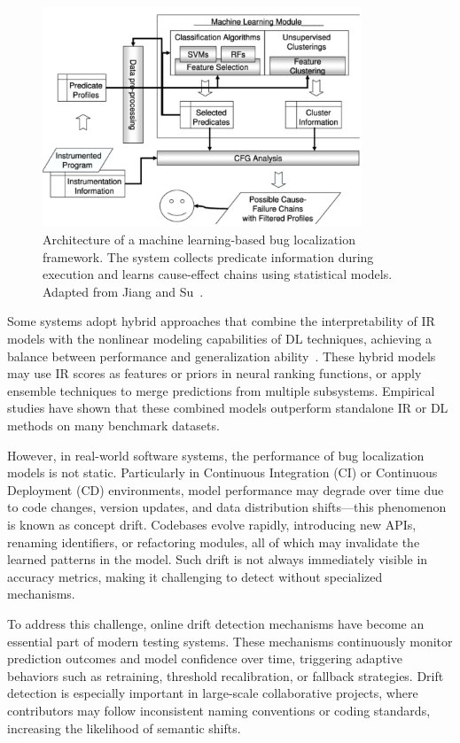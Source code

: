 \documentclass[manuscript,screen,review]{acmart}
\begin{document}
\begin{figure}[htbp]
  \centering
  \includegraphics[width=0.85\textwidth]{picture/5.1fig1.png}
  \caption{Architecture of a machine learning-based bug localization framework. The system collects predicate information during execution and learns cause-effect chains using statistical models. Adapted from Jiang and Su~\cite{Li2024}.}
  \label{fig:framework}
\end{figure}

Some systems adopt hybrid approaches that combine the interpretability of IR models with the nonlinear modeling capabilities of DL techniques, achieving a balance between performance and generalization ability~\cite{Li2024}. These hybrid models may use IR scores as features or priors in neural ranking functions, or apply ensemble techniques to merge predictions from multiple subsystems. Empirical studies have shown that these combined models outperform standalone IR or DL methods on many benchmark datasets.

However, in real-world software systems, the performance of bug localization models is not static. Particularly in Continuous Integration (CI) or Continuous Deployment (CD) environments, model performance may degrade over time due to code changes, version updates, and data distribution shifts---this phenomenon is known as concept drift. Codebases evolve rapidly, introducing new APIs, renaming identifiers, or refactoring modules, all of which may invalidate the learned patterns in the model. Such drift is not always immediately visible in accuracy metrics, making it challenging to detect without specialized mechanisms.

To address this challenge, online drift detection mechanisms have become an essential part of modern testing systems. These mechanisms continuously monitor prediction outcomes and model confidence over time, triggering adaptive behaviors such as retraining, threshold recalibration, or fallback strategies. Drift detection is especially important in large-scale collaborative projects, where contributors may follow inconsistent naming conventions or coding standards, increasing the likelihood of semantic shifts.
\end{document}
